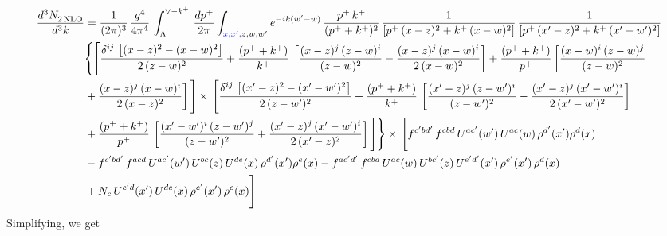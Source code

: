 \documentclass[9pt]{article}
\numberwithin{equation}{section}
\begin{document}
\begin{align}
    \frac{d^{3}N_{2\,\rm NLO}^{\rm}}{d^{3}k}  & = \frac{1}{(2\pi)^{3}}\, \frac{g^{4}}{4\pi^{4}}\,\int_{\Lambda}^{\vee-k^{+}}\, \frac{dp^{+}}{2\pi}\int_{{\color{blue}x,x',} z,w,w^{\prime}} e^{-ik(w^{\prime}-w)}\,\frac{p^{+}\,k^{+}}{(p^{+}+k^{+})^{2}}\, \frac{1}{\left[p^{+}\,(x-z)^{2}+k^{+}\,(x-w)^{2}\right]}\,\frac{1}{\left[p^{+}\,(x'-z)^{2}+k^{+}\,(x'-w')^{2}\right]}\notag \\ & \Bigg\{\Bigg[\frac{\delta^{ij}\, \left[(x-z)^{2}-(x-w)^{2}\right]}{2\,(z-w)^{2}} + \frac{(p^{+}+k^{+})}{k^{+}}\, \left[\frac{(x-z)^{j}\,(z-w)^{i}}{(z-w)^{2}}-\frac{(x-z)^{j}\,(x-w)^{i}}{2\,(x-w)^{2}}\right]+\frac{(p^{+}+k^{+})}{p^{+}}\,\bigg[\frac{(x-w)^{i}\,(z-w)^{j}}{(z-w)^{2}}\notag \\ & +\frac{(x-z)^{j}\,(x-w)^{i}}{2\,(x-z)^{2}}\bigg]\,\Bigg]\times\, \Bigg[\frac{\delta^{ij}\, \left[(x'-z)^{2}-(x'-w')^{2}\right]}{2\,(z-w')^{2}}+ \frac{(p^{+}+k^{+})}{k^{+}}\, \left[\frac{(x'-z)^{j}\,(z-w')^{i}}{(z-w')^{2}}-\frac{(x'-z)^{j}\,(x'-w')^{i}}{2\,(x'-w')^{2}}\right]\notag \\ & +\frac{(p^{+}+k^{+})}{p^{+}}\,\left[\frac{(x'-w')^{i}\,(z-w')^{j}}{(z-w')^{2}} +\frac{(x'-z)^{j}\,(x'-w')^{i}}{2\,(x'-z)^{2}}\right] \Bigg] \Bigg\} \times\,  \Bigg[f^{c'bd'}\,f^{cbd}\, U^{ac'}(w')\,U^{ac}(w)\,\rho^{d'}(x')\rho^{d}(x)\notag \\ & - f^{c'bd'}\,f^{acd}\,U^{ac'}(w')\,U^{bc}(z)\,U^{de}(x)\,\rho^{d'}(x')\rho^{e}(x) -f^{ac'd'}\,f^{cbd}\,U^{ac}(w)\,U^{bc'}(z)\,U^{e'd'}(x')\,\rho^{e'}(x')\,\rho^{d}(x)\notag \\ & +N_{c}\,U^{e'd}(x')\,U^{de}(x)\,\rho^{e'}(x')\,\rho^{e}(x)\Bigg]
\end{align}
Simplifying, we get
\end{document}
